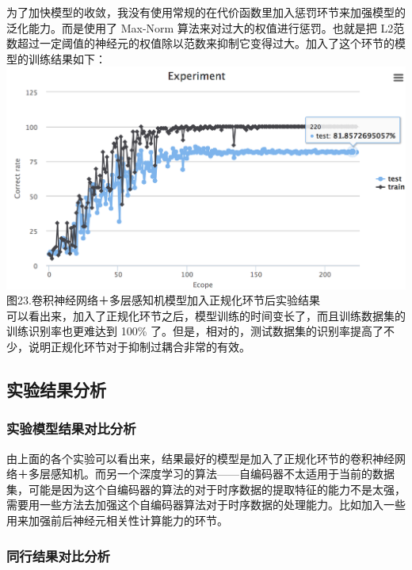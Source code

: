 为了加快模型的收敛，我没有使用常规的在代价函数里加入惩罚环节来加强模型的泛化能力。而是使用了
Max-Norm 算法来对过大的权值进行惩罚。也就是把
L2范数超过一定阈值的神经元的权值除以范数来抑制它变得过大。加入了这个环节的模型的训练结果如下：\\\includegraphics{picture/cnn-mlp-experiment-max-norm.png}\\图23.卷积神经网络＋多层感知机模型加入正规化环节后实验结果\\可以看出来，加入了正规化环节之后，模型训练的时间变长了，而且训练数据集的训练识别率也更难达到
100\%
了。但是，相对的，测试数据集的识别率提高了不少，说明正规化环节对于抑制过耦合非常的有效。

\subsection{实验结果分析}\label{ux5b9eux9a8cux7ed3ux679cux5206ux6790}

\subsubsection{实验模型结果对比分析}\label{ux5b9eux9a8cux6a21ux578bux7ed3ux679cux5bf9ux6bd4ux5206ux6790}

由上面的各个实验可以看出来，结果最好的模型是加入了正规化环节的卷积神经网络＋多层感知机。而另一个深度学习的算法------自编码器不太适用于当前的数据集，可能是因为这个自编码器的算法的对于时序数据的提取特征的能力不是太强，需要用一些方法去加强这个自编码器算法对于时序数据的处理能力。比如加入一些用来加强前后神经元相关性计算能力的环节。

\subsubsection{同行结果对比分析}\label{ux540cux884cux7ed3ux679cux5bf9ux6bd4ux5206ux6790}

